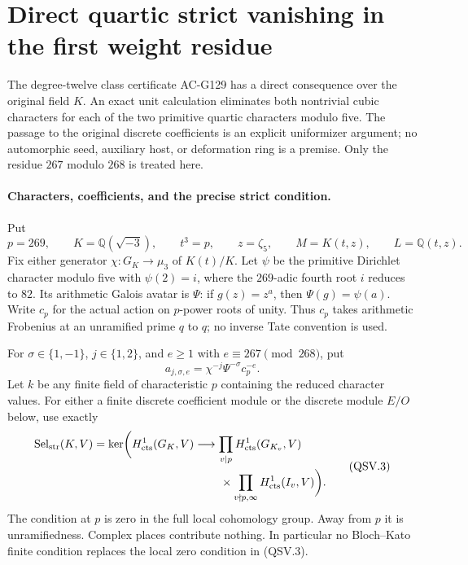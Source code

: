 \section{Direct quartic strict vanishing in the first weight residue}
\label{sec:cubic-quartic-strict-vanishing}

The degree-twelve class certificate AC-G129 has a direct consequence
over the original field \(K\).  An exact unit calculation eliminates
both nontrivial cubic characters for each of the two primitive
quartic characters modulo five.  The passage to the original
discrete coefficients is an explicit uniformizer argument; no
automorphic seed, auxiliary host, or deformation ring is a premise.
Only the residue \(267\) modulo \(268\) is treated here.

\paragraph{Characters, coefficients, and the precise strict condition.}
Put
\[
 p=269,\qquad K=\mathbb Q(\sqrt{-3}),\qquad t^3=p,\qquad
 z=\zeta_5,\qquad M=K(t,z),\qquad L=\mathbb Q(t,z).
 \tag{QSV.1}
\]
Fix either generator
\(\chi:G_K\longrightarrow\mu_3\) of \(K(t)/K\).
Let \(\psi\) be the primitive Dirichlet character modulo five with
\(\psi(2)=i\), where the \(269\)-adic fourth root \(i\) reduces to
\(82\).  Its arithmetic Galois avatar is \(\Psi\): if
\(g(z)=z^a\), then \(\Psi(g)=\psi(a)\).
Write \(c_p\) for the actual action on \(p\)-power roots of unity.
Thus \(c_p\) takes arithmetic Frobenius at an unramified prime \(q\)
to \(q\); no inverse Tate convention is used.

For \(\sigma\in\{1,-1\}\), \(j\in\{1,2\}\), and
\(e\ge1\) with \(e\equiv267\pmod{268}\), put
\[
             a_{j,\sigma,e}=\chi^{-j}\Psi^{-\sigma}c_p^{-e}.
 \tag{QSV.2}
\]
Let \(k\) be any finite field of characteristic \(p\) containing
the reduced character values.  For either a finite discrete
coefficient module or the discrete module \(E/O\) below, use exactly
\[
 \begin{split}
 \operatorname{Sel}_{\mathrm{str}}(K,V)=\ker\biggl(
 H^1_{\mathrm{cts}}(G_K,V)&\longrightarrow
       \prod_{v\mid p}H^1_{\mathrm{cts}}(G_{K_v},V)\\
       &\hspace{8mm}\times
       \prod_{v\nmid p,\infty}H^1_{\mathrm{cts}}(I_v,V)
                         \biggr).
 \end{split}
 \tag{QSV.3}
\]
The condition at \(p\) is zero in the full local cohomology group.
Away from \(p\) it is unramifiedness.  Complex places contribute
nothing.  In particular no Bloch--Kato finite condition replaces the
local zero condition in (QSV.3).

